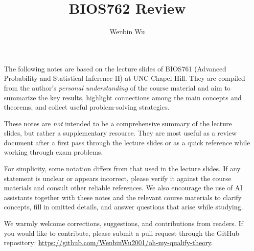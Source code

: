 \documentclass{article}
\author{Wenbin Wu}
\title{BIOS762 Review}
\theoremstyle{break}
\begin{document}
\maketitle

The following notes are based on the lecture slides of BIOS761 (Advanced Probability and Statistical Inference II) at UNC Chapel Hill. They are compiled from the author's \emph{personal understanding} of the course material and aim to summarize the key results, highlight connections among the main concepts and theorems, and collect useful problem-solving strategies.

These notes are \emph{not} intended to be a comprehensive summary of the lecture slides, but rather a supplementary resource. They are most useful as a review document after a first pass through the lecture slides or as a quick reference while working through exam problems.

For simplicity, some notation differs from that used in the lecture slides. If any statement is unclear or appears incorrect, please verify it against the course materials and consult other reliable references. We also encourage the use of AI assistants together with these notes and the relevant course materials to clarify concepts, fill in omitted details, and answer questions that arise while studying.

We warmly welcome corrections, suggestions, and contributions from readers. 
If you would like to contribute, please submit a pull request through the GitHub repository: \url{https://github.com/WenbinWu2001/oh-my-qualify-theory}.

\tableofcontents
\newpage



\end{document}
